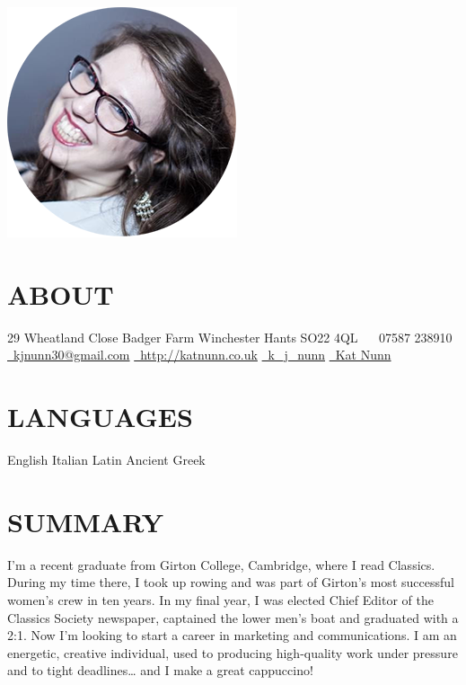 \documentclass[]{friggeri-cv}
\begin{document}
       {}

\begin{aside}
  \includegraphics[width=.66\textwidth]{../img/profile.png}
  \section{ABOUT}
    29 Wheatland Close
    Badger Farm
    Winchester
    Hants
    SO22 4QL
    ~
    \faPhone~07587 238910
    \href{mailto:kjnunn30@gmail.com}{\faEnvelope~kjnunn30@gmail.com}
    \href{http://katnunn.co.uk}{\faGlobe~http://katnunn.co.uk}
    \href{https://twitter.com/k\_j\_nunn}{\faTwitter~k\_j\_nunn}
    \href{http://uk.linkedin.com/in/katnunn/}{\faLinkedin~Kat Nunn}
  \section{LANGUAGES}
    English
    Italian
    Latin
    Ancient Greek
\end{aside}

\section{SUMMARY}

I'm a recent graduate from Girton College, Cambridge, where I read Classics. During my time there, I took up rowing and was part of Girton's most successful women's crew in ten years. In my final year, I was elected Chief Editor of the Classics Society newspaper, captained the lower men's boat and graduated with a 2:1. Now I'm looking to start a career in marketing and communications. I am an energetic, creative individual, used to producing high-quality work under pressure and to tight deadlines… and I make a great cappuccino!
\end{document}
